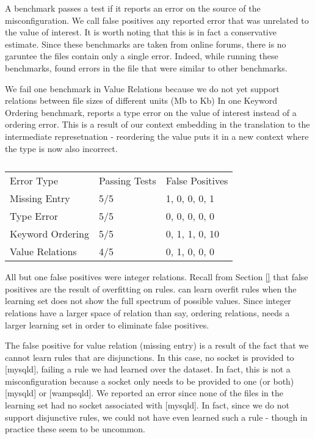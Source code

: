 A benchmark passes a test if it reports an error on the source of the misconfiguration.
We call false positives any reported error that was unrelated to the value of interest.
It is worth noting that this is in fact a conservative estimate.
Since these benchmarks are taken from online forums, there is no garuntee the files contain only a single error.
Indeed, while running these benchmarks, \app found errors in the file that were similar to other benchmarks. 

We fail one benchmark in Value Relations because we do not yet support relations between file sizes of different units (Mb to Kb)
In one Keyword Ordering benchmark, \app reports a type error on the value of interest instead of a ordering error.
This is a result of our context embedding in the translation to the intermediate represetnation - reordering the value puts it in a new context where the type is now also incorrect.

\begin{table}[]
\centering
\caption{}
\label{my-label}
\begin{tabular}{l|l|l}
Error Type       & Passing Tests & False Positives  \\ \hhline{|=|=|=|}
Missing Entry    & 5/5           & 1, 0, 0, 0, 1        \\ \hline
Type Error       & 5/5           & 0, 0, 0, 0, 0          \\ \hline
Keyword Ordering & 5/5           & 0, 1, 1, 0, 10       \\ \hline
Value Relations  & 4/5           & 0, 1, 0, 0, 0        \\ 
\end{tabular}
\end{table}

All but one false positives were integer relations.
Recall from Section \ref{} that false positives are the result of overfitting on rules.
\app can learn overfit rules when the learning set does not show the full spectrum of possible values.
Since integer relations have a larger space of relation than say, ordering relations, \app needs a larger learning set in order to eliminate false positives.

The false positive for value relation (missing entry) is a result of the fact that we cannot learn rules that are disjunctions.
In this case, no socket is provided to [mysqld], failing a rule we had learned over the dataset.
In fact, this is not a misconfiguration because a socket only needs to be provided to one (or both) [mysqld] or [wampsqld].
We reported an error since none of the files in the learning set had no socket associated with [mysqld].
In fact, since we do not support disjunctive rules, we could not have even learned such a rule - though in practice these seem to be uncommon.

